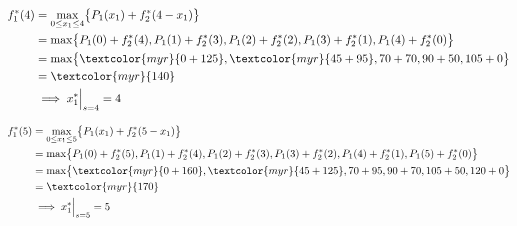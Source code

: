 \documentclass{report}
\begin{document}
\begin{align*}
    f_1^{*}(4) &= \max_{0 \leq x_1 \leq 4} \bigl\{ P_1(x_1) + f_2^{*}(4 - x_1) \bigr\} \\
               &= \max \bigl\{ P_1(0) + f_2^{*}(4), P_1(1) + f_2^{*}(3), P_1(2) + f_2^{*}(2), P_1(3) + f_2^{*}(1), P_1(4) + f_2^{*}(0) \bigr\} \\
               &= \max \bigl\{ \textcolor{myr}{0 + 125}, \textcolor{myr}{45 + 95}, 70 + 70, 90 + 50, 105 + 0 \bigr\} \\
               &= \textcolor{myr}{140} \\
               &\implies x_1^{*}\Big|_{s = 4} = 4
\end{align*}

\begin{align*}
    f_1^{*}(5) &= \max_{0 \leq x_1 \leq 5} \bigl\{ P_1(x_1) + f_2^{*}(5 - x_1) \bigr\} \\
               &= \max \bigl\{ P_1(0) + f_2^{*}(5), P_1(1) + f_2^{*}(4), P_1(2) + f_2^{*}(3), P_1(3) + f_2^{*}(2), P_1(4) + f_2^{*}(1), P_1(5) + f_2^{*}(0) \bigr\} \\
               &= \max \bigl\{ \textcolor{myr}{0 + 160}, \textcolor{myr}{45 + 125}, 70 + 95, 90 + 70, 105 + 50, 120 + 0 \bigr\} \\
               &= \textcolor{myr}{170} \\
               &\implies x_1^{*}\Big|_{s = 5} = 5
\end{align*}
\end{document}
